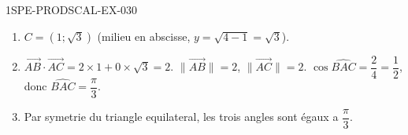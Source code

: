 \begin{corrige}{1SPE-PRODSCAL-EX-030}
\begin{enumerate}
\item $C = (1; \sqrt{3})$ (milieu en abscisse, $y = \sqrt{4 - 1} = \sqrt{3}$).
\item $\overrightarrow{AB} \cdot \overrightarrow{AC} = 2 \times 1 + 0 \times \sqrt{3} = 2$. $\|\overrightarrow{AB}\| = 2$, $\|\overrightarrow{AC}\| = 2$.
$\cos\widehat{BAC} = \dfrac{2}{4} = \dfrac{1}{2}$, donc $\widehat{BAC} = \dfrac{\pi}{3}$.
\item Par symetrie du triangle equilateral, les trois angles sont égaux a $\dfrac{\pi}{3}$.
\end{enumerate}
\end{corrige}
